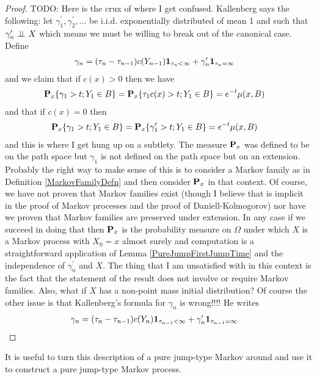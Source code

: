 \begin{proof}
TODO: Here is the crux of where I get confused.  Kallenberg says the
following:
let $\gamma_1^\prime, \gamma_2^\prime, \dotsc$ be i.i.d. exponentially
distributed of mean 1 and such that $\gamma_n^\prime \Independent X$
which means we must be willing to break out of the canonical case.  Define 
\begin{align*}
\gamma_n &= (\tau_n - \tau_{n-1})c(Y_{n-1}) \characteristic{\tau_{n} <
  \infty} + \gamma_n^\prime \characteristic{\tau_{n} =
  \infty} 
\end{align*}
and we claim that if $c(x) > 0$ then we have
\begin{align*}
\sprobability{\gamma_1 > t; Y_1 \in B}{x} &= \sprobability{\tau_1 c(x)
  > t; Y_1 \in B}{x} = e^{-t} \mu(x, B)
\end{align*}
and that if $c(x) = 0$ then 
\begin{align*}
\sprobability{\gamma_1 > t; Y_1 \in B}{x} &= \sprobability{\gamma^\prime_1 
  > t; Y_1 \in B}{x} = e^{-t} \mu(x, B)
\end{align*} 
and this is where I get hung up on a subtlety.  The measure
$\probabilityop_x$ was defined to be on the path space but $\gamma_1$
is not defined on the path space but on an extension.  Probably the
right way to make sense of this is to consider a Markov family as in
Definition \ref{MarkovFamilyDefn} and then consider $\probabilityop_x$
in that context.  Of course, we have not proven that Markov families
exist (though I believe that is implicit in the proof of Markov
processes and the proof of Daniell-Kolmogorov) nor have we proven that
Markov families are preserved under extension.  In any case if we
succeed in doing that then $\probabilityop_x$ is the probability
measure on $\Omega$ under which $X$ is a Markov process with $X_0 = x$
almost surely and computation is a straightforward application of
Lemma \ref{PureJumpFirstJumpTime} and the independence of
$\gamma_n^\prime$ and $X$.  The thing that I am unsatisfied with in this context
is the fact that the statement of the result does not involve or
require Markov
families.  Also, what if $X$ has a non-point mass initial
distribution?  Of course the other issue is that Kallenberg's formula for
$\gamma_n$ is wrong!!!!  He writes
\begin{align*}
\gamma_n &= (\tau_n - \tau_{n-1})c(Y_n) \characteristic{\tau_{n-1} <
  \infty} + \gamma_n^\prime \characteristic{\tau_{n-1} =
  \infty} 
\end{align*}
\end{proof}

It is useful to turn this description of  a pure jump-type Markov
around and use it to construct a pure jump-type Markov process.  

